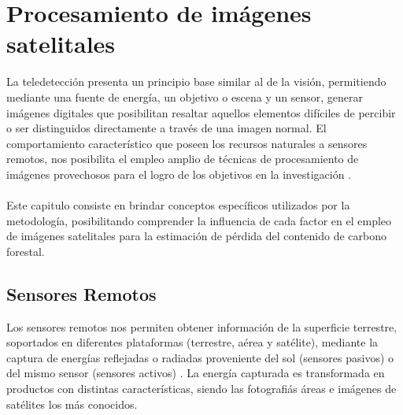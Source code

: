 
\newpage{\ } 
\thispagestyle{empty} 

\chapter{Procesamiento de im\'agenes satelitales}
La teledetecci\'on presenta un principio base similar al de la visi\'on, permitiendo mediante una fuente de energ\'ia, un objetivo o escena y un sensor, generar im\'agenes digitales que posibilitan resaltar aquellos elementos dif\'iciles de percibir o ser distinguidos directamente a trav\'es de una imagen normal. El comportamiento caracter\'istico que poseen los recursos naturales a sensores remotos, nos posibilita el empleo amplio de t\'ecnicas de procesamiento de im\'agenes provechosos para el logro de los objetivos en la investigaci\'on \cite{deespectro}. \\~\\
Este capitulo consiste en brindar conceptos espec\'ificos utilizados por la metodolog\'ia, posibilitando comprender la influencia de cada factor en el empleo de im\'agenes satelitales para la estimaci\'on de p\'erdida del contenido de carbono forestal.

\section{Sensores Remotos}
Los sensores remotos nos permiten obtener informaci\'on de la superficie terrestre, soportados en diferentes plataformas (terrestre, a\'erea y sat\'elite), mediante la captura de energ\'ias reflejadas o radiadas proveniente del sol (sensores pasivos) o del mismo sensor (sensores activos) \cite{gustavo2012deteccion}. La energ\'ia capturada es transformada en productos con distintas características, siendo las fotografi\'as \'areas e im\'agenes de sat\'elites los m\'as conocidos.
